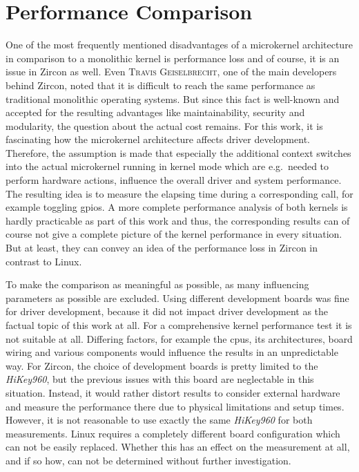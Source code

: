 \section{Performance Comparison}
One of the most frequently mentioned disadvantages of a microkernel architecture in comparison to a monolithic kernel is performance loss and of course, it is an issue in Zircon as well.
Even \textsc{Travis Geiselbrecht}, one of the main developers behind Zircon, noted that it is difficult to reach the same performance as traditional monolithic operating systems\cite{chat-zircon-arch}.
But since this fact is well-known and accepted for the resulting advantages like maintainability, security and modularity, the question about the actual cost remains.
For this work, it is fascinating how the microkernel architecture affects driver development.
Therefore, the assumption is made that especially the additional context switches into the actual microkernel running in kernel mode which are e.g.\ needed to perform hardware actions, influence the overall driver and system performance.
The resulting idea is to measure the elapsing time during a corresponding call, for example toggling \acp{gpio}.
A more complete performance analysis of both kernels is hardly practicable as part of this work and thus, the corresponding results can of course not give a complete picture of the kernel performance in every situation.
But at least, they can convey an idea of the performance loss in Zircon in contrast to Linux.

To make the comparison as meaningful as possible, as many influencing parameters as possible are excluded.
Using different development boards was fine for driver development, because it did not impact driver development as the factual topic of this work at all.
For a comprehensive kernel performance test it is not suitable at all.
Differing factors, for example the \acp{cpu}, its architectures, board wiring and various components would influence the results in an unpredictable way.
For Zircon, the choice of development boards is pretty limited to the \textit{HiKey960}, but the previous issues with this board are neglectable in this situation.
Instead, it would rather distort results to consider external hardware and measure the performance there due to physical limitations and setup times.
However, it is not reasonable to use exactly the same \textit{HiKey960} for both measurements.
Linux requires a completely different board configuration which can not be easily replaced.
Whether this has an effect on the measurement at all, and if so how, can not be determined without further investigation.

